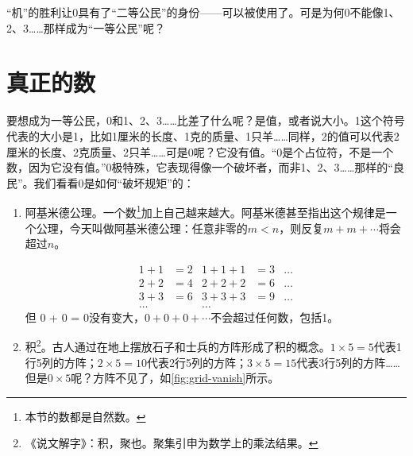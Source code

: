 \documentclass[b5paper]{ctexart}
\begin{document}
“机”的胜利让0具有了“二等公民”的身份——可以被使用了。可是为何0不能像1、2、3……那样成为“一等公民”呢？

\section{真正的数}

要想成为一等公民，0和1、2、3……比差了什么呢？是值，或者说大小。1这个符号代表的大小是1，比如1厘米的长度、1克的质量、1只羊……同样，2的值可以代表2厘米的长度、2克质量、2只羊……可是0呢？它没有值。“0是个占位符，不是一个数，因为它没有值\cite{Seife-2000}。”0极特殊，它表现得像一个破坏者，而非1、2、3……那样的“良民”。我们看看0是如何“破坏规矩”的：

\label{sec:archimedes-axiom}
\begin{enumerate}[1)]
\item 阿基米德公理。一个数\footnote{本节的数都是自然数。}加上自己越来越大。阿基米德甚至指出这个规律是一个公理，今天叫做阿基米德公理：任意非零的$m < n$，则反复$m + m + \cdots$将会超过$n$。 

\begin{align*}
1 + 1 &= 2   & 1 + 1 + 1 &= 3 & \dots \\
2 + 2 &= 4   & 2 + 2 + 2 &= 6 & \dots \\
3 + 3 &= 6   & 3 + 3 + 3 &= 9 & \dots \\
\dots &      & \dots     &    &
\end{align*}
但 0 + 0 = 0没有变大，$0 + 0 + 0 + \cdots$不会超过任何数，包括1。

\item 积\footnote{《说文解字》：积，聚也。聚集引申为数学上的乘法结果。}。古人通过在地上摆放石子和士兵的方阵形成了积的概念。$1 \times 5 = 5$代表1行5列的方阵；$2 \times 5 = 10$代表2行5列的方阵；$3 \times 5 = 15$代表3行5列的方阵……但是$0 \times 5$呢？方阵不见了，如\cref{fig:grid-vanish}所示。

\begin{figure}[htbp]
 \centering
\end{figure}
\end{enumerate}
\end{document}
